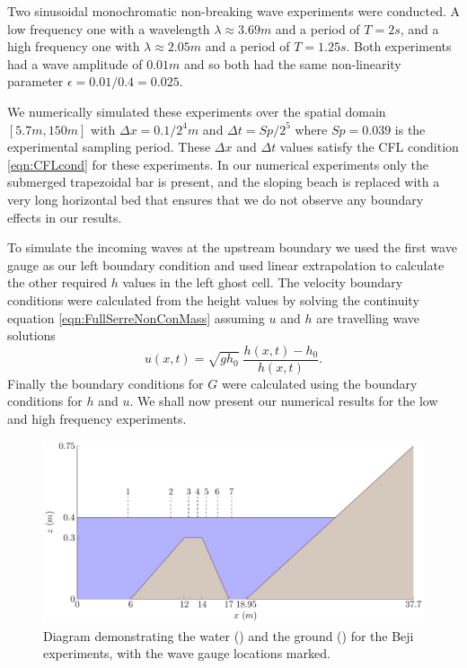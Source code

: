 Two sinusoidal monochromatic non-breaking wave experiments were conducted. A low frequency one with a wavelength $\lambda \approx 3.69m$ and a period of $T = 2s$, and a high frequency one with $\lambda \approx 2.05m$ and a period of $T = 1.25s$. Both experiments had a wave amplitude of $0.01m$ and so both had the same non-linearity parameter $\epsilon = 0.01 / 0.4 = 0.025$. 

We numerically simulated these experiments over the spatial domain $\left[5.7m,150m\right]$ with $\Delta x = 0.1 / 2^4 m$ and $\Delta t = Sp / 2^5$ where $Sp = 0.039$ is the experimental sampling period. These $\Delta x$ and $\Delta t$ values satisfy the CFL condition \eqref{eqn:CFLcond} for these experiments. In our numerical experiments only the submerged trapezoidal bar is present, and the sloping beach is replaced with a very long horizontal bed that ensures that we do not observe any boundary effects in our results.  

To simulate the incoming waves at the upstream boundary we used the first wave gauge as our left boundary condition and used linear extrapolation to calculate the other required $h$ values in the left ghost cell. The velocity boundary conditions were calculated from the height values by solving the continuity equation \eqref{eqn:FullSerreNonConMass} assuming $u$ and $h$ are travelling wave solutions
\begin{equation*}
u(x,t) = \sqrt{g h_0} \; \dfrac{h(x,t) - h_0}{h(x,t)}.
\end{equation*}
Finally the boundary conditions for $G$ were calculated using the boundary conditions for $h$ and $u$. We shall now present our numerical results for the low and high frequency experiments.
%
\begin{figure}
	\centering
		\includegraphics[width=\textwidth]{./chp6/figures/Experiment/Beji/BejiTank.pdf}
	\caption{Diagram demonstrating the water () and the ground  () for the Beji experiments, with the wave gauge locations marked.}
	\label{fig:BejiWT}
\end{figure}
%

